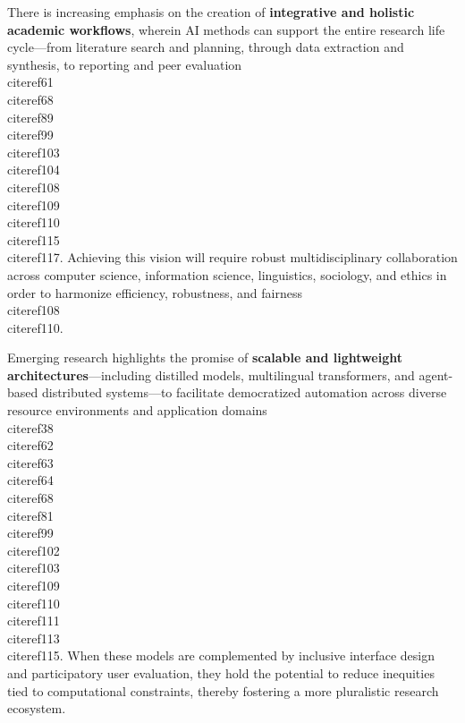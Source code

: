 \documentclass[11pt]{article}
\begin{document}
There is increasing emphasis on the creation of \textbf{integrative and holistic academic workflows}, wherein AI methods can support the entire research life cycle—from literature search and planning, through data extraction and synthesis, to reporting and peer evaluation \\cite{ref61}\\cite{ref68}\\cite{ref89}\\cite{ref99}\\cite{ref103}\\cite{ref104}\\cite{ref108}\\cite{ref109}\\cite{ref110}\\cite{ref115}\\cite{ref117}. Achieving this vision will require robust multidisciplinary collaboration across computer science, information science, linguistics, sociology, and ethics in order to harmonize efficiency, robustness, and fairness \\cite{ref108}\\cite{ref110}.

Emerging research highlights the promise of \textbf{scalable and lightweight architectures}—including distilled models, multilingual transformers, and agent-based distributed systems—to facilitate democratized automation across diverse resource environments and application domains \\cite{ref38}\\cite{ref62}\\cite{ref63}\\cite{ref64}\\cite{ref68}\\cite{ref81}\\cite{ref99}\\cite{ref102}\\cite{ref103}\\cite{ref109}\\cite{ref110}\\cite{ref111}\\cite{ref113}\\cite{ref115}. When these models are complemented by inclusive interface design and participatory user evaluation, they hold the potential to reduce inequities tied to computational constraints, thereby fostering a more pluralistic research ecosystem.
\end{document}
